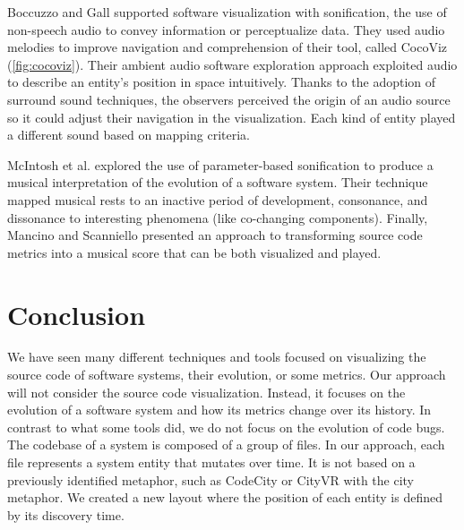 Boccuzzo and Gall \cite{Boccuzzo2009} supported software visualization with sonification, the use of non-speech audio to convey information or perceptualize data. 
They used audio melodies to improve navigation and comprehension of their tool, called CocoViz (\autoref{fig:cocoviz}).
Their ambient audio software exploration approach exploited audio to describe an entity's position in space intuitively. 
Thanks to the adoption of surround sound techniques, the observers perceived the origin of an audio source so it could adjust their navigation in the visualization.
Each kind of entity played a different sound based on mapping criteria.



 
McIntosh et al. \cite{McIntosh2014} explored the use of parameter-based sonification to produce a musical interpretation of the evolution of a software system.
Their technique mapped musical rests to an inactive period of development, consonance, and dissonance to interesting phenomena (like co-changing components).
Finally, Mancino and Scanniello \cite{Mancino2017} presented an approach to transforming source code metrics into a musical score that can be both visualized and played. 


\section{Conclusion}

We have seen many different techniques and tools focused on visualizing the source code of software systems, their evolution, or some metrics.
Our approach will not consider the source code visualization. Instead, it focuses on the evolution of a software system and how its metrics change over its history. 
In contrast to what some tools did, we do not focus on the evolution of code bugs.\\

The codebase of a system is composed of a group of files. In our approach, each file represents a system entity that mutates over time.
It is not based on a previously identified metaphor, such as CodeCity or CityVR with the city metaphor.
We created a new layout where the position of each entity is defined by its discovery time. \\

